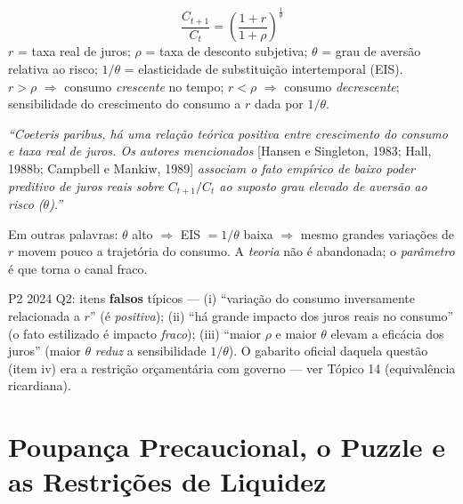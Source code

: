 \documentclass[12pt, a4paper]{article}
\begin{document}
\begin{formulabox}[title={Equação de Euler (forma da chave)}]
\[
\frac{C_{t+1}}{C_t} = \left(\frac{1+r}{1+\rho}\right)^{\frac{1}{\theta}}
\]
$r$ = taxa real de juros; $\rho$ = taxa de desconto subjetiva; $\theta$ = grau
de aversão relativa ao risco; $1/\theta$ = elasticidade de substituição
intertemporal (EIS).\\[0.3em]
$r > \rho$ $\Rightarrow$ consumo \emph{crescente} no tempo;\quad
$r < \rho$ $\Rightarrow$ consumo \emph{decrescente};\quad
sensibilidade do crescimento do consumo a $r$ dada por $1/\theta$.
\end{formulabox}

\begin{correctbox}[title={Chave oficial (Q2): como a literatura explica a fragilidade empírica}]
\emph{``Coeteris paribus, há uma relação teórica positiva entre crescimento do
consumo e taxa real de juros. Os autores mencionados}
[Hansen e Singleton, 1983; Hall, 1988b; Campbell e Mankiw, 1989]
\emph{associam o fato empírico de baixo poder preditivo de juros reais sobre
$C_{t+1}/C_t$ ao suposto grau elevado de aversão ao risco ($\theta$).''}

Em outras palavras: $\theta$ alto $\Rightarrow$ EIS $=1/\theta$ baixa
$\Rightarrow$ mesmo grandes variações de $r$ movem pouco a trajetória do
consumo. A \emph{teoria} não é abandonada; o \emph{parâmetro} é que torna o
canal fraco.
\end{correctbox}

\begin{provabox}[title={Como cai na prova}]
P2 2024 Q2: itens \textbf{falsos} típicos --- (i) ``variação do consumo
inversamente relacionada a $r$'' (é \emph{positiva}); (ii) ``há grande impacto
dos juros reais no consumo'' (o fato estilizado é impacto \emph{fraco});
(iii) ``maior $\rho$ e maior $\theta$ elevam a eficácia dos juros'' (maior
$\theta$ \emph{reduz} a sensibilidade $1/\theta$). O gabarito oficial daquela
questão (item iv) era a restrição orçamentária com governo --- ver Tópico 14
(equivalência ricardiana).
\end{provabox}

\section{Poupança Precaucional, o Puzzle e as Restrições de Liquidez}
\end{document}
